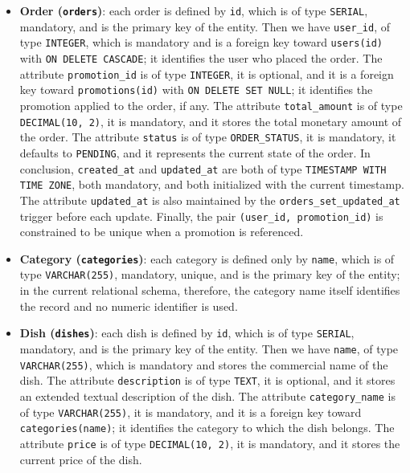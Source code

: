 \begin{itemize}
    \item \textbf{Order (\texttt{orders})}: each order is defined by \texttt{id}, which is of type \texttt{SERIAL}, mandatory, and is the primary key of the entity. Then we have \texttt{user\_id}, of type \texttt{INTEGER}, which is mandatory and is a foreign key toward \texttt{users(id)} with \texttt{ON DELETE CASCADE}; it identifies the user who placed the order. The attribute \texttt{promotion\_id} is of type \texttt{INTEGER}, it is optional, and it is a foreign key toward \texttt{promotions(id)} with \texttt{ON DELETE SET NULL}; it identifies the promotion applied to the order, if any. The attribute \texttt{total\_amount} is of type \texttt{DECIMAL(10, 2)}, it is mandatory, and it stores the total monetary amount of the order. The attribute \texttt{status} is of type \texttt{ORDER\_STATUS}, it is mandatory, it defaults to \texttt{PENDING}, and it represents the current state of the order. In conclusion, \texttt{created\_at} and \texttt{updated\_at} are both of type \texttt{TIMESTAMP WITH TIME ZONE}, both mandatory, and both initialized with the current timestamp. The attribute \texttt{updated\_at} is also maintained by the \texttt{orders\_set\_updated\_at} trigger before each update. Finally, the pair \texttt{(user\_id, promotion\_id)} is constrained to be unique when a promotion is referenced.

    \item \textbf{Category (\texttt{categories})}: each category is defined only by \texttt{name}, which is of type \texttt{VARCHAR(255)}, mandatory, unique, and is the primary key of the entity; in the current relational schema, therefore, the category name itself identifies the record and no numeric identifier is used.

    \item \textbf{Dish (\texttt{dishes})}: each dish is defined by \texttt{id}, which is of type \texttt{SERIAL}, mandatory, and is the primary key of the entity. Then we have \texttt{name}, of type \texttt{VARCHAR(255)}, which is mandatory and stores the commercial name of the dish. The attribute \texttt{description} is of type \texttt{TEXT}, it is optional, and it stores an extended textual description of the dish. The attribute \texttt{category\_name} is of type \texttt{VARCHAR(255)}, it is mandatory, and it is a foreign key toward \texttt{categories(name)}; it identifies the category to which the dish belongs. The attribute \texttt{price} is of type \texttt{DECIMAL(10, 2)}, it is mandatory, and it stores the current price of the dish.


\end{itemize}

